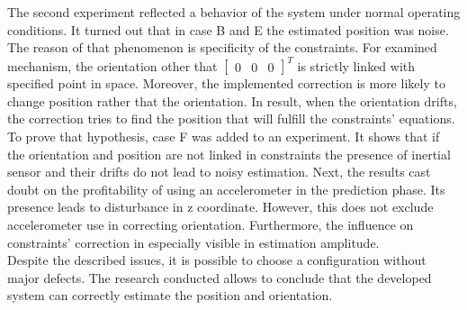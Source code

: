 The second experiment reflected a behavior of the system under normal operating conditions. It turned out that in case B and E the estimated position was noise. The reason of that phenomenon is specificity of the constraints. For examined mechanism, the orientation other that $\begin{bmatrix}0 & 0 & 0 \end{bmatrix}^T$ is strictly linked with specified point in space. Moreover, the implemented correction is more likely to change position rather that the orientation. In result, when the orientation drifts, the correction tries to find the position that will fulfill the constraints' equations. To prove that hypothesis, case F was added to an experiment. It shows that if the orientation and position are not linked in constraints the presence of inertial sensor and their drifts do not lead to noisy estimation. Next, the results cast doubt on the profitability of using an accelerometer in the prediction phase. Its presence leads to disturbance in z coordinate. However, this does not exclude accelerometer use in correcting orientation. Furthermore, the influence on constraints' correction in especially visible in estimation amplitude. \\

  
Despite the described issues, it is possible to choose a configuration without major defects.
The research conducted allows to conclude that the developed system can correctly estimate the position and orientation. 



